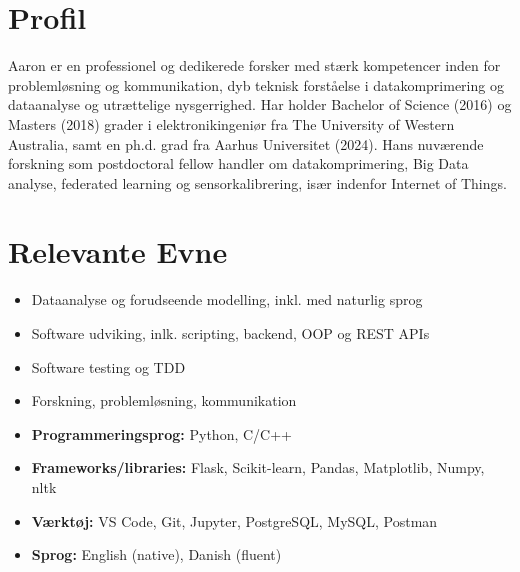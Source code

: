 \documentclass[a4paper,11pt]{article}
\begin{document}






\section{Profil}\vspace{-0.3em}

Aaron er en professionel og dedikerede forsker med stærk kompetencer inden for problemløsning og kommunikation, dyb teknisk forståelse i datakomprimering og dataanalyse og utrættelige nysgerrighed.
Har holder Bachelor of Science (2016) og Masters (2018) grader i elektronikingeniør fra The University of Western Australia, samt en ph.d. grad fra Aarhus Universitet (2024).
Hans nuværende forskning som postdoctoral fellow handler om datakomprimering, Big Data analyse, federated learning og sensorkalibrering, især indenfor Internet of Things.




\section{Relevante Evne}\vspace{-1.3em}

\begin{multicols}{2}
    \begin{itemize}[topsep=0pt,itemsep=-0.3em]
        \item Dataanalyse og forudseende modelling, inkl. med naturlig sprog
        \item Software udviking, inlk. scripting, backend, OOP og REST APIs
        \item Software testing og TDD
        \item Forskning, problemløsning, kommunikation

        \item \textbf{Programmeringsprog:} Python, C/C++
        \item \textbf{Frameworks/libraries:} Flask, Scikit-learn, Pandas, Matplotlib, Numpy, nltk
        \item \textbf{Værktøj:} VS Code, Git, Jupyter, PostgreSQL, MySQL, Postman
        \item \textbf{Sprog:} English (native), Danish (fluent)
    \end{itemize}
\end{multicols}
\vspace{-0.7em}
\end{document}
